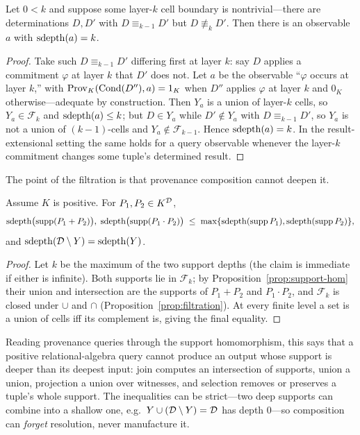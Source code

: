 \begin{proposition}
  \label{prop:reachability}
  Let $0 < k$ and suppose some layer-$k$ cell boundary is nontrivial---there
  are determinations $D, D'$ with $D \equiv_{k-1} D'$ but $D \not\equiv_k D'$.
  Then there is an observable $a$ with $\operatorname{sdepth}(a) = k$.
\end{proposition}
\begin{proof}
  Take such $D \equiv_{k-1} D'$ differing first at layer $k$: say $D$ applies a
  commitment $\varphi$ at layer $k$ that $D'$ does not. Let $a$ be the
  observable ``$\varphi$ occurs at layer $k$,'' with $\operatorname{Prov}_K(\operatorname{Cond}(D''), a) =
  1_K$ when $D''$ applies $\varphi$ at layer $k$ and $0_K$ otherwise---adequate
  by construction. Then $Y_a$ is a union of layer-$k$ cells, so
  $Y_a \in \mathcal{F}_k$ and $\operatorname{sdepth}(a) \le k$; but $D \in Y_a$ while
  $D' \notin Y_a$ with $D \equiv_{k-1} D'$, so $Y_a$ is not a union of
  $(k{-}1)$-cells and $Y_a \notin \mathcal{F}_{k-1}$. Hence $\operatorname{sdepth}(a) = k$. In
  the result-extensional setting the same holds for a query observable whenever
  the layer-$k$ commitment changes some tuple's determined result.
\end{proof}

The point of the filtration is that provenance composition cannot deepen it.

\begin{theorem}
  \label{thm:filtration-respected}
  Assume $K$ is positive. For $P_1, P_2 \in K^{\mathcal{D}}$,
  \[
    \operatorname{sdepth}\bigl(\operatorname{supp}(P_1 + P_2)\bigr),\;
    \operatorname{sdepth}\bigl(\operatorname{supp}(P_1 \cdot P_2)\bigr)
    \;\le\;
    \max\{\operatorname{sdepth}(\operatorname{supp} P_1), \operatorname{sdepth}(\operatorname{supp} P_2)\},
  \]
  and $\operatorname{sdepth}(\mathcal{D} \setminus Y) = \operatorname{sdepth}(Y)$.
\end{theorem}
\begin{proof}
  Let $k$ be the maximum of the two support depths (the claim is immediate if
  either is infinite). Both supports lie in $\mathcal{F}_k$; by
  Proposition~\ref{prop:support-hom} their union and intersection are the
  supports of $P_1+P_2$ and $P_1 \cdot P_2$, and $\mathcal{F}_k$ is closed
  under $\cup$ and $\cap$ (Proposition~\ref{prop:filtration}). At every finite
  level a set is a union of cells iff its complement is, giving the final
  equality.
\end{proof}

\noindent
Reading provenance queries through the support homomorphism, this says that a
positive relational-algebra query cannot produce an output whose support is
deeper than its deepest input: join computes an intersection of supports,
union a union, projection a union over witnesses, and selection removes or
preserves a tuple's whole support. The inequalities can be strict---two deep
supports can combine into a shallow one, e.g.\
$Y \cup (\mathcal{D} \setminus Y) = \mathcal{D}$ has depth $0$---so composition can
\emph{forget} resolution, never manufacture it.

